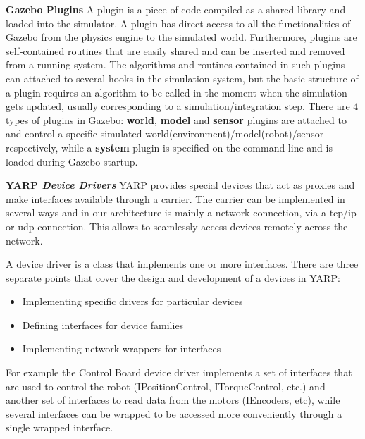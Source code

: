 {\bf Gazebo Plugins}
A plugin is a piece of code compiled as a shared library and loaded into the simulator. A plugin has direct access to all the functionalities of Gazebo from the physics engine to the simulated world. Furthermore, plugins are self-contained routines that are easily shared and can be inserted and removed from a running system. The algorithms and routines contained in such plugins can attached to several hooks in the simulation system, but the basic structure of a plugin requires an algorithm to be called in the moment when the simulation gets updated, usually corresponding to a simulation/integration step. There are 4 types of plugins in Gazebo: \textbf{world}, \textbf{model} and \textbf{sensor} plugins are attached to and control a specific simulated world(environment)/model(robot)/sensor respectively, while a \textbf{system} plugin is specified on the command line and is loaded during Gazebo startup.


{\bf YARP \emph{Device Drivers}}
YARP provides special devices that act as proxies and make interfaces available through a carrier. The carrier can be implemented in several ways and in our architecture is mainly a network connection, via a tcp/ip or udp connection. This allows to seamlessly access devices remotely across the network.

A device driver is a class that implements one or more interfaces. There are three separate points that cover the design and development of a  devices in YARP:
\begin{itemize}
\item Implementing specific drivers for particular devices
\item Defining interfaces for device families
\item Implementing network wrappers for interfaces
\end{itemize}
For example the Control Board device driver implements a set of interfaces that are used to control the robot (IPositionControl, ITorqueControl, etc.) and another set of interfaces to read data from the motors (IEncoders, etc), while several interfaces can be wrapped to be accessed more conveniently through a single wrapped interface.

